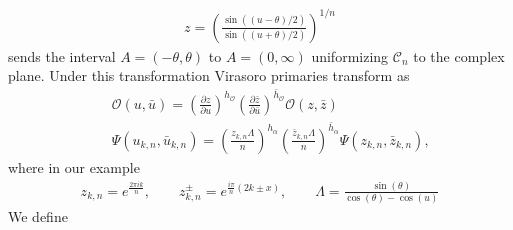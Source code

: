 \documentclass[11pt]{article}
\newcommand{\mO}{\mathcal{O}}
\newcommand{\nn}{\nonumber}
\newcommand{\lb}{\left(}
\newcommand{\rb}{\right)}
\newcommand{\JM}[1]{\textcolor{orange}{#1}}
\begin{document}
  \begin{eqnarray}
    z=\lb\frac{\sin((u-\theta)/2)}{\sin((u+\theta)/2)}\rb^{1/n}
  \end{eqnarray}
  sends the interval $A=(-\theta,\theta)$ to $A=(0,\infty)$ uniformizing
  $\mathcal{C}_{n}$ to the complex plane. Under this transformation Virasoro primaries
  transform as
  \begin{eqnarray}
    &&\mO(u,\bar{u})=\lb\frac{\partial z}{\partial u} \rb^{h_\mO}\lb\frac{\partial
    \bar{z}}{\partial\bar{u}}
    \rb^{\bar{h}_\mO}\mO(z,\bar{z})\nn\\
    &&\Psi(u_{k,n},\bar{u}_{k,n})=\lb\frac{z_{k,n}\Lambda}{n}\rb^{h_\alpha}\lb\frac{\bar{z}_{k,n}\Lambda}{n}\rb^{\bar{h}_\alpha}\Psi(z_{k,n},\bar{z}_{k,n}),
  \end{eqnarray}
  where in our example
  \begin{eqnarray}
    z_{k,n} = e^{\frac{2\pi ik}{n}},\qquad z^\pm_{k,n}=e^{\frac{i\pi}{n}(2k\pm x)},\qquad \Lambda=\frac{\sin(\theta)}{\cos(\theta)-\cos(u)}
  \end{eqnarray}
  We define 
\end{document}
